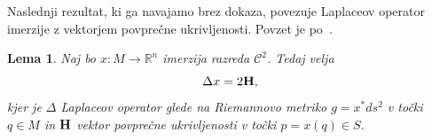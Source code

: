 \documentclass[12pt,a4paper,twoside]{article}
\theoremstyle{definition} %
\theoremstyle{plain} %
\newtheorem{lema}[definicija]{Lema}
\numberwithin{equation}{section}  %
\newcommand{\R}{\mathbb R}
\begin{document}
Naslednji rezultat, ki ga navajamo brez dokaza, povezuje Laplaceov operator imerzije z vektorjem povprečne ukrivljenosti. Povzet je po~\cite[Lemma~2.1.2]{alarcon2021minimal}.

\begin{lema} \label{lema:laplace=2H}
Naj bo $x \colon M \to \R^{n}$ imerzija razreda $\mathcal{C}^2$. Tedaj velja
\begin{equation}
\Delta{x} = 2 \textbf{\textup{H}},
\end{equation}
kjer je $\Delta$ Laplaceov operator glede na Riemannovo metriko $g = x^{*}ds^2$ v točki $q \in M$ in $\textbf{\textup{H}}$ vektor povprečne ukrivljenosti v točki $p = x(q) \in S$.
\end{lema}

\end{document}
